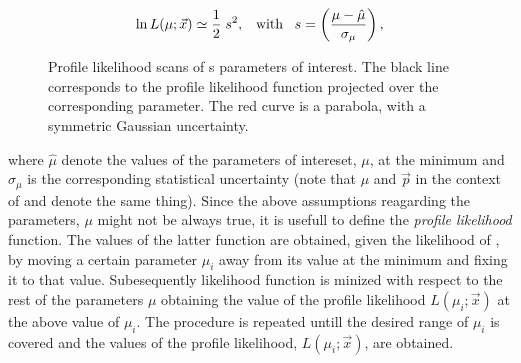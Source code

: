\begin{equation}
\ln L(\mu;\vec{x}) \simeq \frac{1}{2} \; s^2, \;\;\; \text{with} \;\;\; s = \left( \frac{\mu-\hat{\mu}}{\sigma_{\mu}} \right),
\label{likelihood_exp}
\end{equation}

\begin{figure}[!t]
  \centering
  \begin{subfigure}{0.5\textwidth}
    \raggedright
    \scalebox{0.56}{}
    \caption{}
    \label{nll_ACP0}
  \end{subfigure}%
  \hfill%
  \begin{subfigure}{0.5\textwidth}
    \raggedleft
    \scalebox{0.56}{}
    \caption{}
    \label{nll_ACPperp}
  \end{subfigure}
  \begin{subfigure}{0.5\textwidth}
    \raggedright
    \scalebox{0.56}{}
    \caption{}
    \label{nll_ACPpar}
  \end{subfigure}%
  \hfill%
  \begin{subfigure}{0.5\textwidth}
    \raggedleft
    \scalebox{0.56}{}
    \caption{}
    \label{nll_ACPS}
  \end{subfigure}
\caption{Profile likelihood scans of \Acp{} parameters of interest. The black line corresponds to the profile likelihood
         function projected over the corresponding parameter. The red curve is a parabola, with a symmetric Gaussian
         uncertainty.}
\end{figure}

\noindent where $\hat{\mu}$ denote the values of the parameters of intereset, $\mu$, at the minimum and $\sigma_{\mu}$ is
the corresponding statistical uncertainty (note that $\mu$ and $\vec{p}$ in the context of 
and  denote the same thing). Since the above assumptions reagarding the parameters,
$\mu$ might not be always true, it is usefull to define the {\it profile likelihood} function.
The values of the latter function are obtained, given the likelihood of , by moving a certain
parameter $\mu_i$ away from its value at the minimum and fixing it to that value. Subesequently likelihood
function is minized with respect to the rest of the parameters $\mu$ obtaining the value of the profile likelihood
$L(\mu_i;\vec{x})$ at the above value of $\mu_i$. The procedure is repeated untill the desired range of $\mu_i$
is covered and the values of the profile likelihood, $L(\mu_i;\vec{x})$, are obtained.

